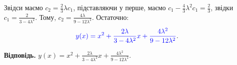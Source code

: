 \documentclass{test_template}
\begin{document}
Звідси маємо $c_2 = \frac{2}{3}\lambda c_1$, підставляючи у перше, маємо $c_1 -
\frac{4}{3}\lambda^2 c_1 = \frac{2}{3}$, звідки $c_1 = \frac{2}{3-4\lambda^2}$.
Тому, $c_2 = \frac{4\lambda}{9-12\lambda^2}$. Остаточно:
\begin{equation*}
    \textcolor{blue}{y(x) = x^2 + \frac{2\lambda}{3-4\lambda^2}x + \frac{4\lambda^2}{9-12\lambda^2}}.
\end{equation*}

\textbf{Відповідь.} $y(x) = x^2 + \frac{2\lambda}{3-4\lambda^2}x +
\frac{4\lambda^2}{9-12\lambda^2}$.
\end{document}
